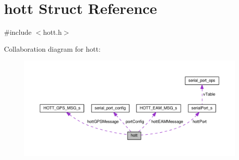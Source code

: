 \hypertarget{structhott}{\section{hott Struct Reference}
\label{structhott}
}


{\ttfamily \#include $<$hott.\+h$>$}



Collaboration diagram for hott\+:\nopagebreak
\begin{figure}[H]
\begin{center}
\leavevmode
\includegraphics[width=350pt]{structhott__coll__graph}
\end{center}
\end{figure}

